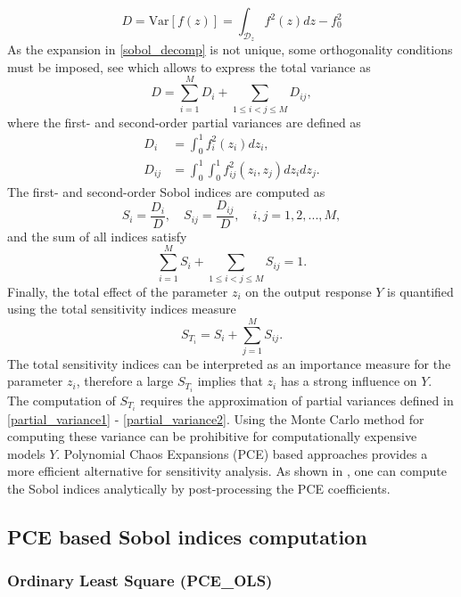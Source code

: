\documentclass[review]{elsarticle}
\numberwithin{equation}{section}
\numberwithin{equation}{section}
\begin{document}
\begin{equation}\label{tot_var}
D = \text{Var}[f(z)] = \int_{\mathcal{D}_{z}} f^2(z)dz - f_0^2
\end{equation}
As the expansion in \eqref{sobol_decomp} is not unique, some orthogonality conditions must be imposed, see \cite{Rabitz1999,SOBOL2001271} which allows to express the total variance as
\begin{equation}
D = \sum_{i=1}^M D_i + \sum_{1\leq i<j\leq M} D_{ij},
\end{equation}
where the first- and second-order partial variances are defined as
\begin{align}
D_i &= \int_{0}^{1} f^2_i(z_i)dz_i, \label{partial_variance1}\\
D_{ij} &= \int_{0}^{1} \int_{0}^{1} f^2_{ij}(z_i,z_j)dz_idz_j \label{partial_variance2}. 
\end{align}
The first- and second-order Sobol indices are computed as
\begin{equation}\label{sobol_ind}
S_i = \frac{D_i}{D}, \quad  S_{ij} = \frac{D_{ij}}{D}, \quad i,j=1,2, ..., M,
\end{equation}
and the sum of all indices satisfy
\begin{equation}
\sum_{i=1}^M S_i + \sum_{1\leq i<j\leq M} S_{ij} = 1.
\end{equation}
Finally, the total effect of the parameter $z_i$ on the output response $Y$ is quantified using the total sensitivity indices measure
\begin{equation}
S_{T_i} = S_i + \sum_{j=1}^M S_{ij}.
\end{equation}
The total sensitivity indices can be interpreted as an importance measure for the parameter $z_i$, therefore a large $S_{T_i}$ implies that $z_i$ has a strong influence on $Y$. The computation of $S_{T_i}$ requires the approximation of partial variances defined in \eqref{partial_variance1} - \eqref{partial_variance2}. Using the Monte Carlo method for computing these variance can be prohibitive for computationally expensive models $Y$.  Polynomial Chaos Expansions (PCE) based approaches provides a more efficient alternative for sensitivity analysis. As shown in  \cite{SUDRET2008964}, one can compute the Sobol indices analytically by post-processing the PCE coefficients.
\subsection{PCE based Sobol indices computation}

\subsubsection{Ordinary Least Square (PCE\_OLS)}
\end{document}
